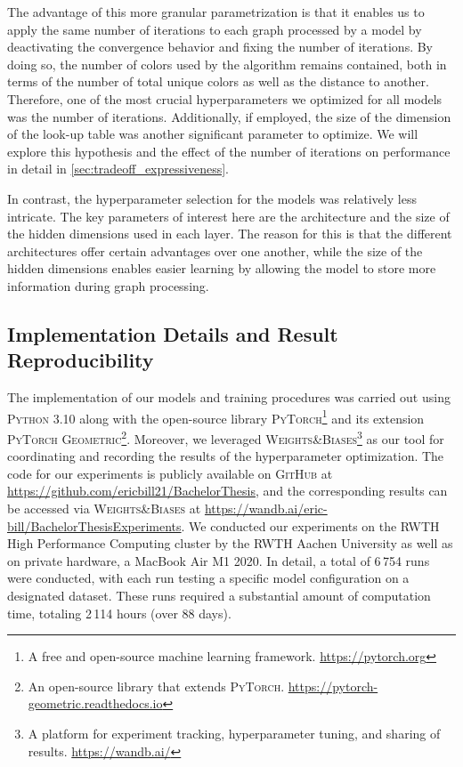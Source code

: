 The advantage of this more granular parametrization is that it enables us to apply the same number of \wl iterations to each graph processed by a \wlnn model by deactivating the convergence behavior and fixing the number of iterations. By doing so, the number of colors used by the \wl algorithm remains contained, both in terms of the number of total unique colors as well as the distance to another. Therefore, one of the most crucial hyperparameters we optimized for all \wlnn models was the number of \wl iterations. Additionally, if employed, the size of the dimension of the look-up table was another significant parameter to optimize. We will explore this hypothesis and the effect of the number of iterations on performance in detail in \cref{sec:tradeoff_expressiveness}.

In contrast, the hyperparameter selection for the \gnn models was relatively less intricate. The key parameters of interest here are the \gnn architecture and the size of the hidden dimensions used in each layer. The reason for this is that the different architectures offer certain advantages over one another, while the size of the hidden dimensions enables easier learning by allowing the model to store more information during graph processing.

\subsection{Implementation Details and Result Reproducibility}
The implementation of our models and training procedures was carried out using \textsc{Python 3.10} along with the open-source library \textsc{PyTorch}\footnote{A free and open-source machine learning framework. \href{https://pytorch.org}{https://pytorch.org}} and its extension \textsc{PyTorch Geometric}\footnote{An open-source library that extends \textsc{PyTorch}. \href{https://pytorch-geometric.readthedocs.io/en/latest}{https://pytorch-geometric.readthedocs.io}}. Moreover, we leveraged \textsc{Weights\&Biases}\footnote{A platform for experiment tracking, hyperparameter tuning, and sharing of results. \href{https://wandb.ai/}{https://wandb.ai/}} as our tool for coordinating and recording the results of the hyperparameter optimization. The code for our experiments is publicly available on \textsc{GitHub} at \url{https://github.com/ericbill21/BachelorThesis}, and the corresponding results can be accessed via \textsc{Weights\&Biases} at \url{https://wandb.ai/eric-bill/BachelorThesisExperiments}. We conducted our experiments on the RWTH High Performance Computing cluster by the RWTH Aachen University as well as on private hardware, a MacBook Air M1 2020. In detail, a total of 6\,754 runs were conducted, with each run testing a specific model configuration on a designated dataset. These runs required a substantial amount of computation time, totaling 2\,114 hours (over 88 days).

